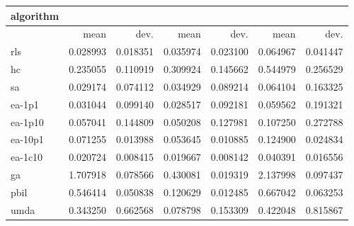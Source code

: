 \begin{tabular}{@{}l*{6}{>{{}}N{1}{2}}@{}}
\toprule
{algorithm} &  &  &  \\
\midrule
& {mean} & {dev.} & {mean} & {dev.} & {mean} & {dev.} \\
\midrule
rls & 0.028993 & 0.018351 & 0.035974 & 0.023100 & 0.064967 & 0.041447 \\
 hc & 0.235055 & 0.110919 & 0.309924 & 0.145662 & 0.544979 & 0.256529 \\
 sa & 0.029174 & 0.074112 & 0.034929 & 0.089214 & 0.064104 & 0.163325 \\
 ea-1p1 & 0.031044 & 0.099140 & 0.028517 & 0.092181 & 0.059562 & 0.191321 \\
 ea-1p10 & 0.057041 & 0.144809 & 0.050208 & 0.127981 & 0.107250 & 0.272788 \\
 ea-10p1 & 0.071255 & 0.013988 & 0.053645 & 0.010885 & 0.124900 & 0.024834 \\
 ea-1c10 & 0.020724 & 0.008415 & 0.019667 & 0.008142 & 0.040391 & 0.016556 \\
 ga & 1.707918 & 0.078566 & 0.430081 & 0.019319 & 2.137998 & 0.097437 \\
 pbil & 0.546414 & 0.050838 & 0.120629 & 0.012485 & 0.667042 & 0.063253 \\
 umda & 0.343250 & 0.662568 & 0.078798 & 0.153309 & 0.422048 & 0.815867 \\
 \bottomrule
\end{tabular}
